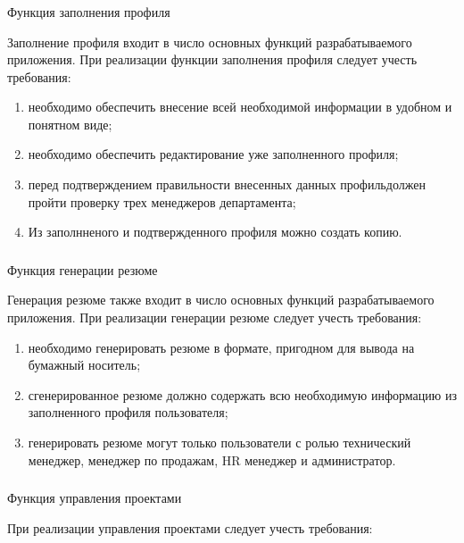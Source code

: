 \subsubsection{} Функция заполнения профиля
\label{sec:domain:specification:profile}

Заполнение профиля входит в число основных функций разрабатываемого приложения. При реализации функции заполнения
профиля следует учесть требования:

\begin{enumerate}
	\item необходимо обеспечить внесение всей необходимой информации в удобном и понятном виде;
	\item необходимо обеспечить редактирование уже заполненного профиля;
  \item перед подтверждением правильности внесенных данных профиль\linebreak должен пройти проверку трех менеджеров
  департамента;
	\item Из заполнненого и подтвержденного профиля можно создать копию.
\end{enumerate}

\subsubsection{} Функция генерации резюме
\label{sec:domain:specification:resume}

Генерация резюме также входит в число основных функций разрабатываемого приложения. При реализации генерации
резюме следует учесть требования:

\begin{enumerate}
	\item необходимо генерировать резюме в формате, пригодном для вывода на бумажный носитель;
	\item сгенерированное резюме должно содержать всю необходимую информацию из заполненного профиля пользователя;
  \item генерировать резюме могут только пользователи с ролью технический менеджер, менеджер по продажам,
  HR менеджер и администратор.
\end{enumerate}

\subsubsection{} Функция управления проектами
\label{sec:domain:specification:projects}

При реализации управления проектами следует учесть требования:


